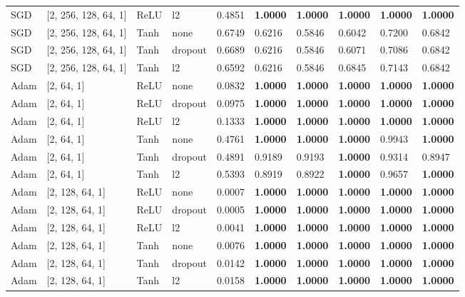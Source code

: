 \documentclass[12pt,a4paper]{article}
\begin{document}
\begin{table}[h]
\begin{tabular}{llllllllll}
SGD & [2, 256, 128, 64, 1] & ReLU & l2 & 0.4851 & \textbf{1.0000} & \textbf{1.0000} & \textbf{1.0000} & \textbf{1.0000} & \textbf{1.0000} \\
SGD & [2, 256, 128, 64, 1] & Tanh & none & 0.6749 & 0.6216 & 0.5846 & 0.6042 & 0.7200 & 0.6842 \\
SGD & [2, 256, 128, 64, 1] & Tanh & dropout & 0.6689 & 0.6216 & 0.5846 & 0.6071 & 0.7086 & 0.6842 \\
SGD & [2, 256, 128, 64, 1] & Tanh & l2 & 0.6592 & 0.6216 & 0.5846 & 0.6845 & 0.7143 & 0.6842 \\
Adam & [2, 64, 1] & ReLU & none & 0.0832 & \textbf{1.0000} & \textbf{1.0000} & \textbf{1.0000} & \textbf{1.0000} & \textbf{1.0000} \\
Adam & [2, 64, 1] & ReLU & dropout & 0.0975 & \textbf{1.0000} & \textbf{1.0000} & \textbf{1.0000} & \textbf{1.0000} & \textbf{1.0000} \\
Adam & [2, 64, 1] & ReLU & l2 & 0.1333 & \textbf{1.0000} & \textbf{1.0000} & \textbf{1.0000} & \textbf{1.0000} & \textbf{1.0000} \\
Adam & [2, 64, 1] & Tanh & none & 0.4761 & \textbf{1.0000} & \textbf{1.0000} & \textbf{1.0000} & 0.9943 & \textbf{1.0000} \\
Adam & [2, 64, 1] & Tanh & dropout & 0.4891 & 0.9189 & 0.9193 & \textbf{1.0000} & 0.9314 & 0.8947 \\
Adam & [2, 64, 1] & Tanh & l2 & 0.5393 & 0.8919 & 0.8922 & \textbf{1.0000} & 0.9657 & \textbf{1.0000} \\
Adam & [2, 128, 64, 1] & ReLU & none & 0.0007 & \textbf{1.0000} & \textbf{1.0000} & \textbf{1.0000} & \textbf{1.0000} & \textbf{1.0000} \\
Adam & [2, 128, 64, 1] & ReLU & dropout & 0.0005 & \textbf{1.0000} & \textbf{1.0000} & \textbf{1.0000} & \textbf{1.0000} & \textbf{1.0000} \\
Adam & [2, 128, 64, 1] & ReLU & l2 & 0.0041 & \textbf{1.0000} & \textbf{1.0000} & \textbf{1.0000} & \textbf{1.0000} & \textbf{1.0000} \\
Adam & [2, 128, 64, 1] & Tanh & none & 0.0076 & \textbf{1.0000} & \textbf{1.0000} & \textbf{1.0000} & \textbf{1.0000} & \textbf{1.0000} \\
Adam & [2, 128, 64, 1] & Tanh & dropout & 0.0142 & \textbf{1.0000} & \textbf{1.0000} & \textbf{1.0000} & \textbf{1.0000} & \textbf{1.0000} \\
Adam & [2, 128, 64, 1] & Tanh & l2 & 0.0158 & \textbf{1.0000} & \textbf{1.0000} & \textbf{1.0000} & \textbf{1.0000} & \textbf{1.0000} \\

\end{tabular}
\end{table}
\end{document}
